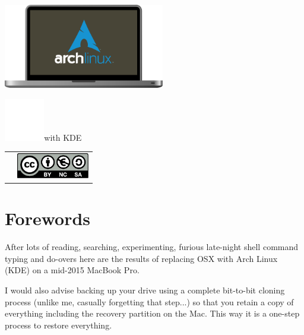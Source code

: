 \vspace*{\fill}
\includegraphics[height=10em]{img/ArchMBP.pdf}\linebreak
\begin{mdframed}[style=titlebox]
	\centering
	\begin{Huge}
		\par
	\end{Huge}
\end{mdframed}
\vspace*{2em}
\includegraphics[height=5em]{img/kde-logo.pdf}with KDE\par
\vspace*{\fill}
\begin{tabularx}{0.95\textwidth}{lR}
	& \includegraphics[height=3em]{../common/licenses/by-nc-sa_eu.pdf}
\end{tabularx}
\vspace*{2em}

\setcounter{page}{1}
\pagecolor{white}
\color{dark}
\normalsize\justify
\tableofcontents
\clearpage

\section{Forewords}

After lots of reading, searching, experimenting, furious late-night shell command typing and do-overs here are the results of replacing OSX with Arch Linux (KDE) on a mid-2015 MacBook Pro. 

I would also advise backing up your drive using a complete bit-to-bit cloning process (unlike me, casually forgetting that step...) so that you retain a copy of everything including the recovery partition on the Mac. This way it is a one-step process to restore everything.

